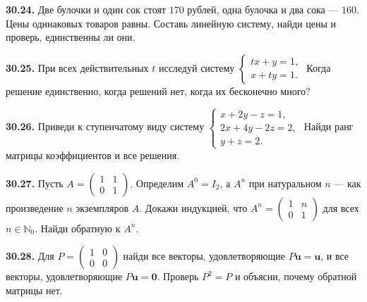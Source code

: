 \ifdim\dimexpr\ht\CatFlowBox+\dp\CatFlowBox\relax<58mm\dp\CatFlowBox=\dimexpr58mm-\ht\CatFlowBox\relax\fi%
\noindent\usebox{\CatFlowBox}\par\addvspace{2pt}

\noindent\begin{minipage}[t]{\linewidth}\textbf{30.24.} Две булочки и один сок стоят \(170\) рублей, одна булочка и два сока — \(160\). Цены одинаковых товаров равны. Составь линейную систему, найди цены и проверь, единственны ли они.\par\end{minipage}\par
\noindent\begin{minipage}[t]{\linewidth}\textbf{30.25.}\starmark{} При всех действительных \(t\) исследуй систему \(\begin{cases}tx+y=1,\\x+ty=1.\end{cases}\) Когда решение единственно, когда решений нет, когда их бесконечно много?\par\end{minipage}\par
\noindent\begin{minipage}[t]{\linewidth}\textbf{30.26.}\starmark{} Приведи к ступенчатому виду систему \(\begin{cases}x+2y-z=1,\\2x+4y-2z=2,\\y+z=2.\end{cases}\) Найди ранг матрицы коэффициентов и все решения.\par\end{minipage}\par
\noindent\begin{minipage}[t]{\linewidth}\textbf{30.27.}\starmark{} Пусть \(A=\begin{pmatrix}1&1\\0&1\end{pmatrix}\). Определим \(A^0=I_2\), а \(A^n\) при натуральном \(n\) — как произведение \(n\) экземпляров \(A\). Докажи индукцией, что \(A^n=\begin{pmatrix}1&n\\0&1\end{pmatrix}\) для всех \(n\in\mathbb N_0\). Найди обратную к \(A^n\).\par\end{minipage}\par
\noindent\begin{minipage}[t]{\linewidth}\textbf{30.28.}\starmark{} Для \(P=\begin{pmatrix}1&0\\0&0\end{pmatrix}\) найди все векторы, удовлетворяющие \(P\symbf u=\symbf u\), и все векторы, удовлетворяющие \(P\symbf u=\symbf0\). Проверь \(P^2=P\) и объясни, почему обратной матрицы нет.\par\end{minipage}\par
